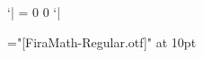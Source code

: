 \Udelcode`| = 0 0 `|

\font\mainfont="[FiraMath-Regular.otf]" at 10pt
\mainfont
\def\bye{\par\vfill\supereject\end}
\def\fmtname{plain} %

\def\frac#1#2{{#1\over#2}}

\def\sqrt{\Uradical 0 "221A }

\dump

